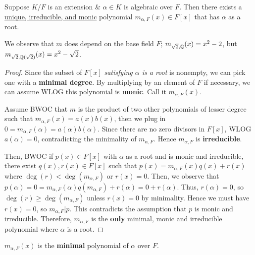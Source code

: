\documentclass[12pt]{article}
\begin{document}
    \begin{proposition}
        Suppose $K/F$ is an extension \& $\alpha\in K$ is algebraic over $F$. Then there exists a \uline{unique, irreducible, and monic} polynomial $m_{\alpha,F}(x)\in F[x]$ that has $\alpha$ as a root.
    \end{proposition}
    \rmk We observe that $m$ does depend on the base field $F$; $m_{\sqrt{2},\mathbb{Q}}(x)=x^2-2$, but $m_{\sqrt{2},\mathbb{Q}(\sqrt{2})}(x)=x^2-\sqrt{2}$.
    \begin{proof}
        Since the subset of $F[x]$ \textit{satisfying $\alpha$ is a root} is nonempty, we can pick one with a \textbf{minimal degree}. By multiplying by an element of $F$ if necessary, we can assume WLOG this polynomial is \textbf{monic}. Call it $m_{\alpha,F}(x)$. 
        
        Assume BWOC that $m$ is the product of two other polynomials of lesser degree such that $m_{\alpha,F}(x)=a(x)b(x)$, then we plug in $0=m_{\alpha,F}(\alpha)=a(\alpha)b(\alpha)$. Since there are no zero divisors in $F[x]$, WLOG $a(\alpha)=0$, contradicting the minimality of $m_{\alpha,F}$. Hence $m_{\alpha,F}$ is \textbf{irreducible}.

        Then, BWOC if $p(x)\in F[x]$ with $\alpha$ as a root and is monic and irreducible, there exist $q(x),r(x)\in F[x]$ such that $p(x)=m_{\alpha,F}(x)q(x)+r(x)$ where $\deg(r)< \deg(m_{\alpha,F})$ or $r(x)=0$. Then, we observe that $p(\alpha)=0=m_{\alpha,F}(\alpha)q(m_{\alpha,F})+r(\alpha)=0+r(\alpha)$. Thus, $r(\alpha)=0$, so $\deg(r)\geq \deg(m_{\alpha,F})$ unless $r(x)=0$ by minimality. Hence we must have $r(x)=0$, so $m_{\alpha,F}|p$. This contradicts the assumption that $p$ is monic and irreducible.
        Therefore, $m_{\alpha,F}$ is the \textbf{only} minimal, monic and irreducible polynomial where $\alpha$ is a root.
    \end{proof}

     $m_{\alpha, F}(x)$ is the \textbf{minimal} polynomial of $\alpha$ over $F$.

\end{document}
